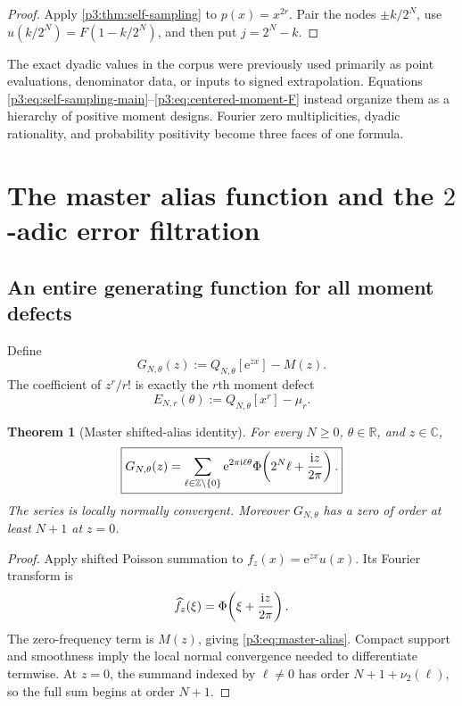 \documentclass[11pt,oneside]{article}
\numberwithin{equation}{section}
\newtheorem{theorem}{Theorem}[section]
\theoremstyle{definition}
\theoremstyle{remark}
\newcommand{\R}{\mathbb R}
\newcommand{\C}{\mathbb C}
\newcommand{\Z}{\mathbb Z}
\newcommand{\e}{\mathrm e}
\begin{document}
\begin{proof}
Apply \cref{p3:thm:self-sampling} to $p(x)=x^{2r}$.  Pair the nodes $\pm k/2^N$, use $u(k/2^N)=F(1-k/2^N)$, and then put $j=2^N-k$.
\end{proof}

\begin{resultbox}
The exact dyadic values in the corpus were previously used primarily as point evaluations, denominator data, or inputs to signed extrapolation.  Equations \eqref{p3:eq:self-sampling-main}--\eqref{p3:eq:centered-moment-F} instead organize them as a hierarchy of positive moment designs.  Fourier zero multiplicities, dyadic rationality, and probability positivity become three faces of one formula.
\end{resultbox}

\section{The master alias function and the $2$-adic error filtration}
\label{p3:sec:alias}

\subsection{An entire generating function for all moment defects}

Define
\begin{equation}
 G_{N,\theta}(z)
 :=Q_{N,\theta}[\e^{zx}]-M(z).
 \label{p3:eq:G-def}
\end{equation}
The coefficient of $z^r/r!$ is exactly the $r$th moment defect
\begin{equation}
 E_{N,r}(\theta)
 :=Q_{N,\theta}[x^r]-\mu_r.
 \label{p3:eq:ENr-def}
\end{equation}

\begin{theorem}[Master shifted-alias identity]
\label{p3:thm:master-alias}
For every $N\ge0$, $\theta\in\R$, and $z\in\C$,
\begin{equation}
 \boxed{\displaystyle
 G_{N,\theta}(z)
 =\sum_{\ell\in\Z\setminus\{0\}}
 \e^{2\pi\iu\ell\theta}
 \Phi\!\left(2^N\ell+\frac{\iu z}{2\pi}\right).}
 \label{p3:eq:master-alias}
\end{equation}
The series is locally normally convergent.  Moreover $G_{N,\theta}$ has a zero of order at least $N+1$ at $z=0$.
\end{theorem}

\begin{proof}
Apply shifted Poisson summation to $f_z(x)=\e^{zx}u(x)$.  Its Fourier transform is
\[
 \widehat f_z(\xi)
 =\Phi\!\left(\xi+\frac{\mathrm i z}{2\pi}\right).
\]
The zero-frequency term is $M(z)$, giving \eqref{p3:eq:master-alias}.  Compact support and smoothness imply the local normal convergence needed to differentiate termwise.  At $z=0$, the summand indexed by $\ell\ne0$ has order
$N+1+\nu_2(\ell)$, so the full sum begins at order $N+1$.
\end{proof}
\end{document}
